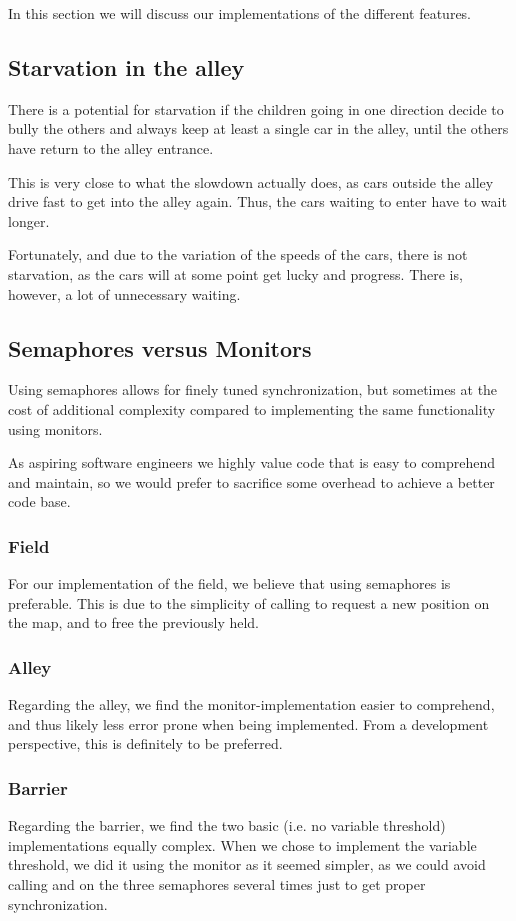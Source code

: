 
In this section we will discuss our implementations of the different features.

\subsection{Starvation in the alley}
There is a potential for starvation if the children going in one direction decide to bully the others and always keep at least a single car in the alley, until the others have return to the alley entrance.

This is very close to what the slowdown actually does, as cars outside the alley drive fast to get into the alley again. Thus, the cars waiting to enter have to wait longer.

Fortunately, and due to the variation of the speeds of the cars, there is not starvation, as the cars will at some point get lucky and progress. There is, however, a lot of unnecessary waiting.

\subsection{Semaphores versus Monitors}
\label{sub:disc-sema-moni}
Using semaphores allows for finely tuned synchronization, but sometimes at the cost of additional complexity compared to implementing the same functionality using monitors.

As aspiring software engineers we highly value code that is easy to comprehend and maintain, so we would prefer to sacrifice some overhead to achieve a better code base.

\subsubsection{Field}
\label{subsub:disc-field}
For our implementation of the field, we believe that using semaphores is preferable. This is due to the simplicity of calling  to request a new position on the map, and  to free the previously held.

\subsubsection{Alley}
\label{subsub:disc-alley}
Regarding the alley, we find the monitor-implementation easier to comprehend, and thus likely less error prone when being implemented. From a development perspective, this is definitely to be preferred.


\subsubsection{Barrier}
\label{subsub:disc-barrier}
Regarding the barrier, we find the two basic (i.e. no variable threshold) implementations equally complex. When we chose to implement the variable threshold, we did it using the monitor as it seemed simpler, as we could avoid calling  and  on the three semaphores several times just to get proper synchronization.